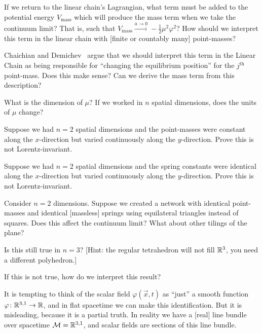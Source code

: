 \begin{exercise}
If we return to the linear chain's Lagrangian, what term must be added
to the potential energy $V_{\text{mass}}$ which will produce the mass term when
we take the continuum limit? That is, such that $V_{\text{mass}}\xrightarrow{a\to0}-\frac{1}{2}\mu^{2}\varphi^{2}$? How should we interpret this term
in the linear chain with [finite or countably many] point-masses?

Chaichian and Demichev~\cite{Chaichian:2001da} argue that we should
interpret this term in the Linear Chain as being responsible for
``changing the equilibrium position'' for the $j^{\text{th}}$
point-mass. Does this make sense? Can we derive the mass term from this
description? 
\end{exercise}

\begin{exercise}
What is the dimension of $\mu$? 
If we worked in $n$ spatial dimensions, does the units of $\mu$ change?
\end{exercise}

\begin{exercise}
Suppose we had $n=2$ spatial dimensions and the point-masses were
constant along the $x$-direction but varied continuously along the
$y$-direction. Prove this is not Lorentz-invariant.
\end{exercise}

\begin{exercise}
Suppose we had $n=2$ spatial dimensions and the spring constants were
identical along the $x$-direction but varied continuously along the
$y$-direction. Prove this is not Lorentz-invariant.
\end{exercise}


\begin{exercise}
Consider $n=2$ dimensions. Suppose we created a network with identical
point-masses and identical [massless] springs using equilateral
triangles instead of squares. Does this affect the continuum limit?
What about other tilings of the plane?

Is this still true in $n=3$? [Hint: the regular tetrahedron will not
fill $\mathbb{R}^{3}$, you need a different polyhedron.]

If this is not true, how do we interpret this result?
\end{exercise}

It is tempting to think of the scalar field $\varphi(\vec{x},t)$ as
``just'' a smooth function $\varphi\colon\mathbb{R}^{3,1}\to\mathbb{R}$, and in flat
spacetime we can make this identification. But it is misleading, because
it is a partial truth. In reality we have a [real] line bundle over
spacetime $\mathcal{M}=\mathbb{R}^{3,1}$, and scalar fields are sections of
this line bundle.

